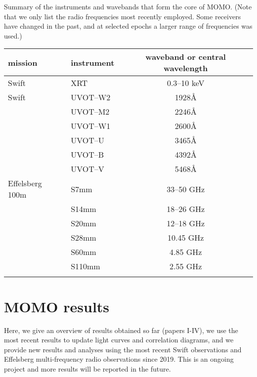 \documentclass[preprints,article,accept,moreauthors,pdftex]{Definitions/mdpi}
\begin{document}
\begin{specialtable}[H] 
\caption{Summary of the instruments and wavebands that form the core of MOMO. (Note that we only list the radio frequencies most recently employed. Some receivers have changed in the past, and at selected epochs a larger range of frequencies was used.) \label{tab-overview}}
\begin{tabular}{llc}
\toprule
\textbf{mission}	& \textbf{instrument}	& \textbf{waveband or central wavelength}  \\
\midrule
Swift & XRT & 0.3--10 keV  \\
Swift & UVOT--W2 & 1928\AA \\ 
      & UVOT--M2 & 2246\AA \\ 
      & UVOT--W1 & 2600\AA \\ 
      & UVOT--U & 3465\AA \\ 
      & UVOT--B & 4392\AA \\ 
      & UVOT--V & 5468\AA \\ 
Effelsberg 100m & S7mm  & 33--50 GHz \\ 
                & S14mm  & 18--26 GHz \\ 
                & S20mm  & 12--18 GHz \\ 
                & S28mm  & 10.45 GHz \\ 
                & S60mm  &  4.85 GHz \\ 
                & S110mm &  2.55 GHz \\ 
\bottomrule
\label{tab:overview}
\end{tabular}
\end{specialtable}



\section{MOMO results}
Here, we give an overview of results obtained so far (papers I-IV), we use the most recent results to update light curves and correlation diagrams, and we provide new results and analyses using the most recent Swift observations and Effelsberg multi-frequency radio observations since 2019. This is an ongoing project and more results will be reported in the future. 
\end{document}
